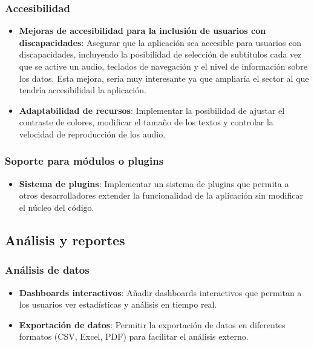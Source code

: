 \documentclass[a4paper, 12pt]{book}
\begin{document}
\subsubsection{Accesibilidad}

\begin{itemize}
    \item \textbf{Mejoras de accesibilidad para la inclusión de usuarios con discapacidades}: 
    Asegurar que la aplicación sea accesible para usuarios con discapacidades, incluyendo la posibilidad de selección de subtítulos cada vez que se active un audio, teclados de navegación y el nivel de información sobre los datos. Esta mejora, seria muy interesante ya que ampliaría el sector al que tendría accesibilidad la aplicación.
    
    \item \textbf{Adaptabilidad de recursos}: Implementar la posibilidad de ajustar el contraste de colores, modificar el tamaño de los textos y controlar la velocidad de reproducción de los audio.
\end{itemize}

\subsubsection{Soporte para módulos o plugins}

\begin{itemize}
    \item \textbf{Sistema de plugins}: Implementar un sistema de plugins que permita a otros desarrolladores extender la funcionalidad de la aplicación sin modificar el núcleo del código.
\end{itemize}

\subsection{Análisis y reportes}

\subsubsection{Análisis de datos}

\begin{itemize}
    \item \textbf{Dashboards interactivos}: Añadir dashboards interactivos que permitan a los usuarios ver estadísticas y análisis en tiempo real.
    \item \textbf{Exportación de datos}: Permitir la exportación de datos en diferentes formatos (CSV, Excel, PDF) para facilitar el análisis externo.
\end{itemize}
\end{document}
